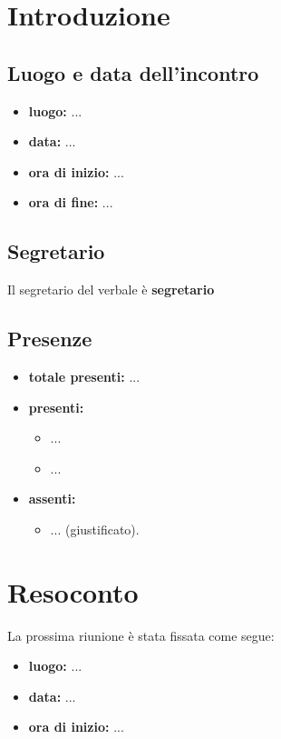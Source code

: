 \section{Introduzione}

\subsection{Luogo e data dell'incontro}
	\begin{itemize}
		\item \textbf{luogo:} ...
		\item \textbf{data:} ...
		\item \textbf{ora di inizio:} ...
		\item \textbf{ora di fine:} ...
	\end{itemize}


\subsection{Segretario}
Il segretario del verbale è \textbf{segretario}


\subsection{Presenze}
	\begin{itemize}
		\item \textbf{totale presenti:} ...
		\item \textbf{presenti: }
			\begin{itemize}			
				\item ...
				\item ...
			\end{itemize}
		\item \textbf{assenti: } 
			\begin{itemize}	
				\item ... (giustificato).
			\end{itemize}
	\end{itemize}


\newpage
\section{Resoconto}
		
La prossima riunione è stata fissata come segue:
\begin{itemize}
	\item \textbf{luogo:} ...
	\item \textbf{data:} ...
	\item \textbf{ora di inizio:} ...
\end{itemize}


